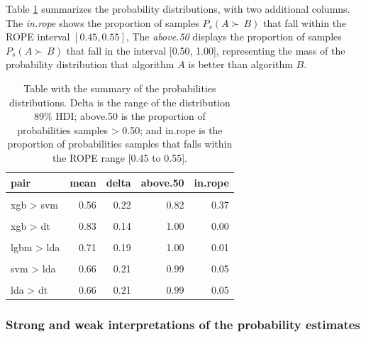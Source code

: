 \documentclass[twoside,11pt,preprint]{article}
\begin{document}
Table \ref{tab:main} summarizes the probability distributions, with two additional columns. The {\em in.rope} shows the proportion of samples \(P_s(A \succ\,B)\) that fall within the ROPE interval \([0.45, 0.55]\), The {\em above.50}
displays the proportion of samples \(P_s(A \succ\,B)\) that fall in the interval {[}0.50, 1.00{]}, representing the mass of the probability distribution that algorithm \(A\) is better than algorithm \(B\).

\begin{table}

\caption{\label{tab:xtaball2}\label{tab:main}Table with the summary of the probabilities distributions. Delta is the range of the distribution 89\% HDI; above.50 is the proportion of probabilities samples > 0.50; and in.rope is the proportion of probabilities samples that falls within the ROPE range [0.45 to 0.55].}
\centering
\begin{tabular}[t]{lrrrr}
\toprule
\textbf{pair} & \textbf{mean} & \textbf{delta} & \textbf{above.50} & \textbf{in.rope}\\
\midrule
\cellcolor{gray!6}{xgb > lgbm} & \cellcolor{gray!6}{0.51} & \cellcolor{gray!6}{0.23} & \cellcolor{gray!6}{0.56} & \cellcolor{gray!6}{0.49}\\
xgb > svm & 0.56 & 0.22 & 0.82 & 0.37\\
\cellcolor{gray!6}{xgb > lda} & \cellcolor{gray!6}{0.72} & \cellcolor{gray!6}{0.19} & \cellcolor{gray!6}{1.00} & \cellcolor{gray!6}{0.01}\\
xgb > dt & 0.83 & 0.14 & 1.00 & 0.00\\
\cellcolor{gray!6}{lgbm > svm} & \cellcolor{gray!6}{0.55} & \cellcolor{gray!6}{0.23} & \cellcolor{gray!6}{0.77} & \cellcolor{gray!6}{0.40}\\
\addlinespace
lgbm > lda & 0.71 & 0.19 & 1.00 & 0.01\\
\cellcolor{gray!6}{lgbm > dt} & \cellcolor{gray!6}{0.82} & \cellcolor{gray!6}{0.14} & \cellcolor{gray!6}{1.00} & \cellcolor{gray!6}{0.00}\\
svm > lda & 0.66 & 0.21 & 0.99 & 0.05\\
\cellcolor{gray!6}{svm > dt} & \cellcolor{gray!6}{0.79} & \cellcolor{gray!6}{0.17} & \cellcolor{gray!6}{1.00} & \cellcolor{gray!6}{0.00}\\
lda > dt & 0.66 & 0.21 & 0.99 & 0.05\\
\bottomrule
\end{tabular}
\end{table}

\hypertarget{strong-and-weak-interpretations-of-the-probability-estimates}{%
\subsubsection{\texorpdfstring{Strong and weak interpretations of the probability estimates \label{strong-weak}}{Strong and weak interpretations of the probability estimates }}\label{strong-and-weak-interpretations-of-the-probability-estimates}}
\end{document}
